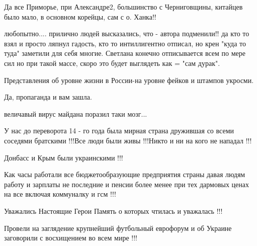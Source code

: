 \begin{itemize}
Да все Приморье, при Александре2, большинство с Черниговщины, китайцев было
мало, в основном корейцы, сам с о. Ханка!!

 

любопытно.... прилично людей высказались, что - автора подменили!! да кто то
взял и просто ляпнул гадость, кто то интиллигентно отписал, но крен "куда то
туда" заметили для себя многие. Светлана конечно отписывается всем по мере сил
но при такой массе, скоро это будет выглядеть как = "сам дурак".


 

Представления об уровне жизни в России-на уровне фейков и штампов укросми.

Да, пропаганда и вам зашла.


 

величавый вирус майдана поразил таки мозг...

 

У нас до переворота 14 - го года была мирная страна дружившая со всеми соседями
братскими !!!Все люди были живы !!!Никто и ни на кого не нападал !!!

Донбасс и Крым были украинскими !!! 

Как часы работали все бюджетообразующие предприятия страны давая людям работу и
зарплаты не последние и пенсии более менее при тех дармовых ценах на все
включая коммуналку и гсм !!!

Уважались Настоящие Герои Память о которых чтилась и уважалась !!!

Провели на заглядение крупнейший футбольный еврофорум и об Украине заговорили с
восхищением во всем мире !!!


\end{itemize}
